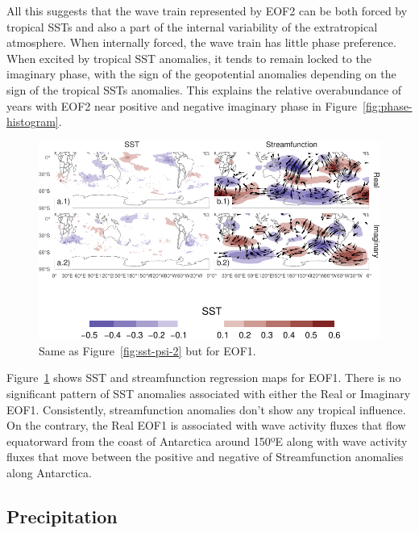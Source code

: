 \documentclass[smallextended]{svjour3}       %
\begin{document}
All this suggests that the wave train represented by EOF2 can be both forced by tropical SSTs and also a part of the internal variability of the extratropical atmosphere. When internally forced, the wave train has little phase preference. When excited by tropical SST anomalies, it tends to remain locked to the imaginary phase, with the sign of the geopotential anomalies depending on the sign of the tropical SSTs anomalies. This explains the relative overabundance of years with EOF2 near positive and negative imaginary phase in Figure~\ref{fig:phase-histogram}.



\begin{figure}
\centering
\includegraphics{../figures/sst-psi-1-1.pdf}
\caption{\label{fig:sst-psi-1}Same as Figure~\ref{fig:sst-psi-2} but for EOF1.}
\end{figure}

Figure~\ref{fig:sst-psi-1} shows SST and streamfunction regression maps for EOF1. There is no significant pattern of SST anomalies associated with either the Real or Imaginary EOF1. Consistently, streamfunction anomalies don't show any tropical influence. On the contrary, the Real EOF1 is associated with wave activity fluxes that flow equatorward from the coast of Antarctica around 150ºE along with wave activity fluxes that move between the positive and negative of Streamfunction anomalies along Antarctica.

\hypertarget{precipitation}{%
\subsection{Precipitation}\label{precipitation}}
\end{document}
